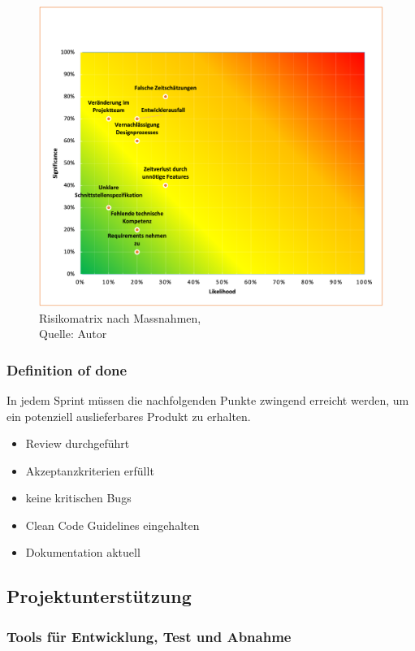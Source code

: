 \begin{figure}[H]
    \centering
   \includegraphics[width=1\textwidth]{images/RiskMap_naher.png}
    \caption[Risikomatrix nach Massnahmen]{Risikomatrix nach Massnahmen,\\ Quelle: Autor}
    \label{img: RisikomatrixNachher}
\end{figure}

\subsubsection{Definition of done}
In jedem Sprint müssen die nachfolgenden Punkte zwingend erreicht werden, um ein potenziell auslieferbares Produkt zu erhalten.

\begin{itemize}
\item Review durchgeführt
\item Akzeptanzkriterien erfüllt
\item keine kritischen Bugs
\item Clean Code Guidelines eingehalten
\item Dokumentation aktuell
\end{itemize}
\newpage
\subsection{Projektunterst\"utzung}
\subsubsection{Tools f\"ur Entwicklung, Test und Abnahme}
